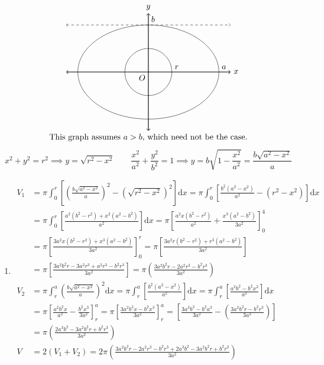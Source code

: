\documentclass[12pt, A4]{report}
\renewcommand{\d}{\text{d}}
\begin{document}
\begin{enumerate}
					\[\begin{tikzpicture}
						\draw[thick, <->] (-3.5, 0) -- (3.5, 0) node[anchor = west]{$x$};
						\draw[thick, <->] (0, -2.5) -- (0, 2.5) node[anchor = south]{$y$};
							\node[anchor = north east]{$O$};
						\draw[] circle[radius = 1];
							\node[anchor = south west] at (1, 0) {$r$};
						\draw[] ellipse(3cm and 2cm);
							\node[anchor = south west] at (0, 2) {$b$};
							\node[anchor = south west] at (3, 0) {$a$};
						\draw[dashed, <->] (-3.5, 2) -- (3.5, 2);
						\node[anchor = north] at (0, -2.5) {This graph assumes $a > b$, which need not be the case.};
					\end{tikzpicture}\]
					\[
						x^2 + y^2 = r^2 
								\implies y = \sqrt{r^2 - x^2} \qquad 
								\frac{x^2}{a^2} + \frac{y^2}{b^2} = 1 
									\implies y = b\sqrt{1 - \frac{x^2}{a^2}} = \frac{b\sqrt{a^2 - x^2}}{a}
					\]
					\begin{enumerate}
						\item
							\begin{align*}
								V_1 &= \pi\int_0^r\left[\left(\frac{b\sqrt{a^2 - x^2}}{a}\right)^2 - \left(\sqrt{r^2 - x^2}\right)^2\right]\d x
										= \pi\int_0^r\left[\frac{b^2(a^2 - x^2)}{a^2} - (r^2 - x^2)\right]\d x \\
									&= \pi\int_0^r\left[\frac{a^2(b^2 - r^2) + x^2(a^2 - b^2)}{a^2}\right]\d x 
										= \pi\left[\frac{a^2x(b^2 - r^2)}{a^2} + \frac{x^3(a^2 - b^2)}{3a^2}\right]_0^4 \\
									&= \pi\left[\frac{3a^2x(b^2 - r^2) + x^3(a^2 - b^2)}{3a^2}\right]_0^r
										= \pi\left[\frac{3a^2r(b^2 - r^2) + r^3(a^2 - b^2)}{3a^2}\right] \\
									&= \pi\left[\frac{3a^2b^2r - 3a^2r^3 + a^2r^3 - b^2r^3}{3a^2}\right]
										= \pi\left(\frac{3a^2b^2r - 2a^2r^3 - b^2r^3}{3a^2}\right) \\
								V_2 &= \pi\int_r^a\left(\frac{b\sqrt{a^2 - x^2}}{a}\right)^2\d x
										= \pi\int_r^a\left[\frac{b^2(a^2 - x^2)}{a^2}\right]\d x  = \pi\int_r^a\left[\frac{a^2b^2 - b^2x^2}{a^2}\right]\d x \\
									&= \pi\left[\frac{a^2b^2x}{a^2} - \frac{b^2x^3}{3a^2}\right]_r^a 
										= \pi\left[\frac{3a^2b^2x - b^2x^3}{3a^2}\right]_r^a 
										= \left[\frac{3a^3b^2 - b^2a^3}{3a^2} - \left(\frac{3a^2b^2r -b^2r^3}{3a^2}\right)\right] \\
									&= \pi\left(\frac{2a^3b^2 -3a^2b^2r + b^2r^3}{3a^2}\right) \\
								V &= 2(V_1 + V_2)
										= 2\pi\left(\frac{3a^2b^2r - 2a^2r^3 - b^2r^3 + 2a^3b^2 - 3a^2b^2r + b^2r^3}{3a^2}\right) \\

\end{align*}
\end{enumerate}
\end{enumerate}
\end{document}
